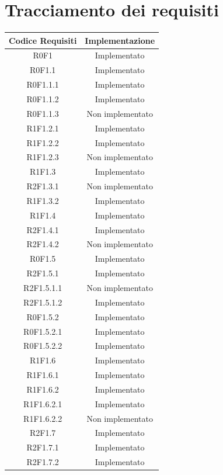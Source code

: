 \appendix
\section{Tracciamento dei requisiti}
\label{sec:Tracciamento}

\normalsize
\begin{longtable}{|c|c|}
	\hline
	\textbf{Codice Requisiti} & \textbf{Implementazione} \\
	\hline
	\endhead
	R0F1 & Implementato\\
	\hline
	R0F1.1  & Implementato\\
	\hline
	R0F1.1.1  & Implementato\\
	\hline
	R0F1.1.2  & Implementato\\
	\hline
	R0F1.1.3 & Non implementato\\
	\hline
	R1F1.2.1 & Implementato\\
	\hline
	R1F1.2.2 & Implementato\\
	\hline
	R1F1.2.3 & Non implementato\\
	\hline
	R1F1.3 & Implementato\\
	\hline
	R2F1.3.1 & Non implementato\\
	\hline
	R1F1.3.2 & Implementato\\
	\hline
	R1F1.4 & Implementato\\
	\hline
	R2F1.4.1 & Implementato\\
	\hline
	R2F1.4.2 & Non implementato\\
	\hline
	R0F1.5 & Implementato\\
	\hline
	R2F1.5.1 & Implementato\\
	\hline
	R2F1.5.1.1 & Non implementato\\
	\hline
	R2F1.5.1.2 & Implementato\\
	\hline
	R0F1.5.2 & Implementato\\
	\hline
	R0F1.5.2.1 & Implementato\\
	\hline
	R0F1.5.2.2 & Implementato\\
	\hline
	R1F1.6 & Implementato\\
	\hline
	R1F1.6.1 & Implementato\\
	\hline
	R1F1.6.2 & Implementato\\
	\hline
	R1F1.6.2.1 & Implementato\\
	\hline
	R1F1.6.2.2 & Non implementato\\
	\hline
	R2F1.7 & Implementato\\
	\hline
	R2F1.7.1 & Implementato\\
	\hline
	R2F1.7.2 & Implementato\\

\end{longtable}
